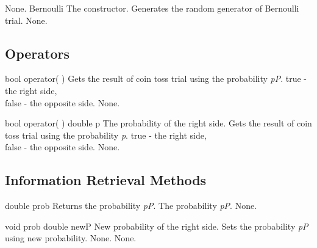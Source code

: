 \clearpage

\setNormalInstance
\setCorrectWidthThree{8pt}
\printMethodWithParamsSaved
{}
{None.}
{Bernoulli}
{The constructor. Generates the random generator of Bernoulli trial.}
{None.}
\setCorrectWidthThree{4pt}

\vspace*{10mm}

\subsection{Operators}

\setNormalInstance
\printEmptyMethodReturnSpecial
{bool}
{operator( )}
{Gets the result of coin toss trial using the probability {\em pP}.}
{true - the right side,\\false - the opposite side.}
{None.}

\setNormalInstance
\printMethodWithOneParam
{bool}
{operator( )}
{double}
{p}
{The probability of the right side.}
{Gets the result of coin toss trial using the probability {\em p}.}
{true - the right side,\\false - the opposite side.}
{None.}

\clearpage

\subsection{Information Retrieval Methods}

\setConstInstance
\printEmptyMethodReturnSpecial
{double}
{prob}
{Returns the probability {\em pP}.}
{The probability {\em pP}.}
{None.}

\setNormalInstance
\printMethodWithOneParam
{void}
{prob}
{double}
{newP}
{New probability of the right side.}
{Sets the probability {\em pP} using new probability.}
{None.}
{None.}

